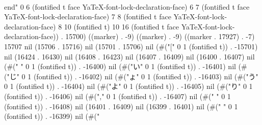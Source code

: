  \\end{}" 0 6 (fontified t face YaTeX-font-lock-declaration-face) 6 7 (fontified t face YaTeX-font-lock-declaration-face) 7 8 (fontified t face YaTeX-font-lock-declaration-face) 8 10 (fontified t) 10 16 (fontified t face YaTeX-font-lock-declaration-face)) . 15700) ((marker) . -9) ((marker) . -9) ((marker . 17927) . -7) 15707 nil (15706 . 15716) nil (15701 . 15706) nil (#("[" 0 1 (fontified t)) . -15701) nil (16424 . 16430) nil (16408 . 16423) nil (16407 . 16409) nil (16400 . 16407) nil (#(" " 0 1 (fontified t)) . -16400) nil (#("い" 0 1 (fontified t)) . -16401) nil (#("じ" 0 1 (fontified t)) . -16402) nil (#("ょ" 0 1 (fontified t)) . -16403) nil (#("う" 0 1 (fontified t)) . -16404) nil (#("よ" 0 1 (fontified t)) . -16405) nil (#("り" 0 1 (fontified t)) . -16406) nil (#("," 0 1 (fontified t)) . -16407) nil (#(" " 0 1 (fontified t)) . -16408) nil (16401 . 16409) nil (16399 . 16401) nil (#("
" 0 1 (fontified t)) . -16399) nil (#("
